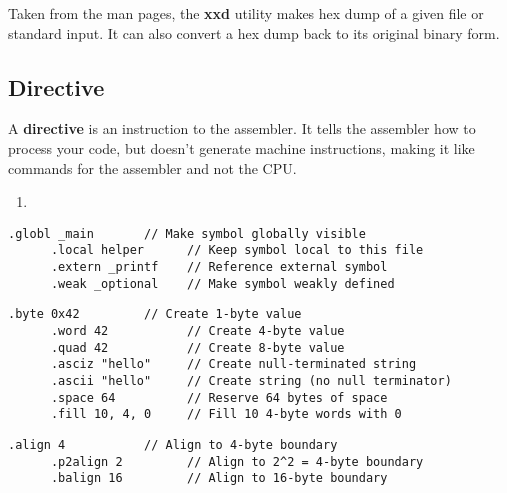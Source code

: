   \begin{definition}
    Taken from the man pages, the \textbf{xxd} utility makes hex dump of a given file or standard input. It can also convert a hex dump back to its original binary form. 
  \end{definition} 

\subsection{Directive}

  \begin{definition}[Directive]
    A \textbf{directive} is an instruction to the assembler. It tells the assembler how to process your code, but doesn't generate machine instructions, making it like commands for the assembler and not the CPU. 

    \begin{enumerate}
      \item 
    \end{enumerate}
  \end{definition}

  \begin{example}
    \begin{lstlisting}[language=assembly]
      .globl _main       // Make symbol globally visible
      .local helper      // Keep symbol local to this file
      .extern _printf    // Reference external symbol
      .weak _optional    // Make symbol weakly defined
    \end{lstlisting}
  \end{example}

  \begin{example}
    \begin{lstlisting}[language=assembly]
      .byte 0x42         // Create 1-byte value
      .word 42           // Create 4-byte value  
      .quad 42           // Create 8-byte value
      .asciz "hello"     // Create null-terminated string
      .ascii "hello"     // Create string (no null terminator)
      .space 64          // Reserve 64 bytes of space
      .fill 10, 4, 0     // Fill 10 4-byte words with 0
    \end{lstlisting}
  \end{example}

  \begin{example}[Alignment]
    \begin{lstlisting}[language=assembly]
      .align 4           // Align to 4-byte boundary
      .p2align 2         // Align to 2^2 = 4-byte boundary  
      .balign 16         // Align to 16-byte boundary
    \end{lstlisting}
  \end{example}

